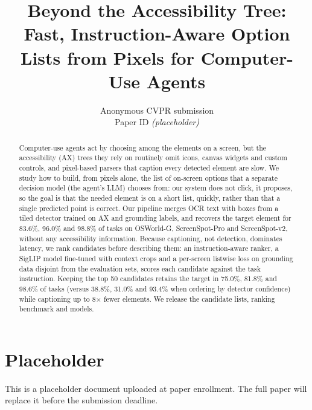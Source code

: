 \documentclass[10pt,twocolumn,letterpaper]{article}
\begin{document}
\title{Beyond the Accessibility Tree: Fast, Instruction-Aware Option Lists from Pixels for Computer-Use Agents}
\author{Anonymous CVPR submission\\Paper ID \emph{(placeholder)}}
\date{}
\maketitle
\begin{abstract}
Computer-use agents act by choosing among the elements on a screen, but the accessibility (AX) trees they rely on routinely omit icons, canvas widgets and custom controls, and pixel-based parsers that caption every detected element are slow. We study how to build, from pixels alone, the list of on-screen options that a separate decision model (the agent's LLM) chooses from: our system does not click, it proposes, so the goal is that the needed element is on a short list, quickly, rather than that a single predicted point is correct. Our pipeline merges OCR text with boxes from a tiled detector trained on AX and grounding labels, and recovers the target element for 83.6\%, 96.0\% and 98.8\% of tasks on OSWorld-G, ScreenSpot-Pro and ScreenSpot-v2, without any accessibility information. Because captioning, not detection, dominates latency, we rank candidates before describing them: an instruction-aware ranker, a SigLIP model fine-tuned with context crops and a per-screen listwise loss on grounding data disjoint from the evaluation sets, scores each candidate against the task instruction. Keeping the top 50 candidates retains the target in 75.0\%, 81.8\% and 98.6\% of tasks (versus 38.8\%, 31.0\% and 93.4\% when ordering by detector confidence) while captioning up to 8$\times$ fewer elements. We release the candidate lists, ranking benchmark and models.
\end{abstract}
\section*{Placeholder}
This is a placeholder document uploaded at paper enrollment. The full paper will replace it before the submission deadline.
\end{document}
